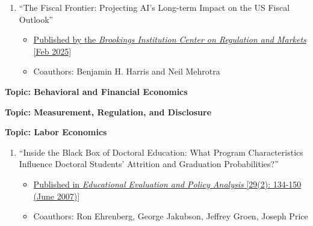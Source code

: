 \documentclass[11pt]{article}
\begin{document}
\begin{enumerate}
\item ``The Fiscal Frontier: Projecting AI's Long-term Impact on the US Fiscal Outlook''
\begin{itemize}
\vspace*{-.07in}
	\item \href{https://www.brookings.edu/articles/the-fiscal-frontier-projecting-ais-long-term-impact-on-the-us-fiscal-outlook/}{Published by the {\it Brookings Institution Center on Regulation and Markets} [Feb 2025]}
\vspace*{-.07in}
	\item Coauthors: Benjamin H. Harris and Neil Mehrotra
\end{itemize}

\end{enumerate}

\medskip
\vspace*{.2in}
{\bf Topic: Behavioral and Financial Economics} \\
\vspace*{-.2in}
\begin{enumerate}
    
\end{enumerate}

\medskip
\vspace*{.2in}
{\bf Topic: Measurement, Regulation, and Disclosure} \\
\vspace*{-.2in}
\begin{enumerate}
     
\end{enumerate}

\medskip
\vspace*{.1in}
{\bf Topic: Labor Economics} \\
\vspace*{-.2in}
\begin{enumerate}
\item``Inside the Black Box of Doctoral Education: What Program Characteristics Influence Doctoral Students' Attrition and Graduation Probabilities?''
\begin{itemize}
\vspace*{-.07in}
	\item \href{https://doi.org/10.3102/0162373707301707}{Published in {\it Educational Evaluation and Policy Analysis} [29(2): 134-150 (June 2007)]}
\vspace*{-.07in}
	\item Coauthors: Ron Ehrenberg, George Jakubson, Jeffrey Groen, Joseph Price
\end{itemize}
\end{enumerate}
\end{document}
